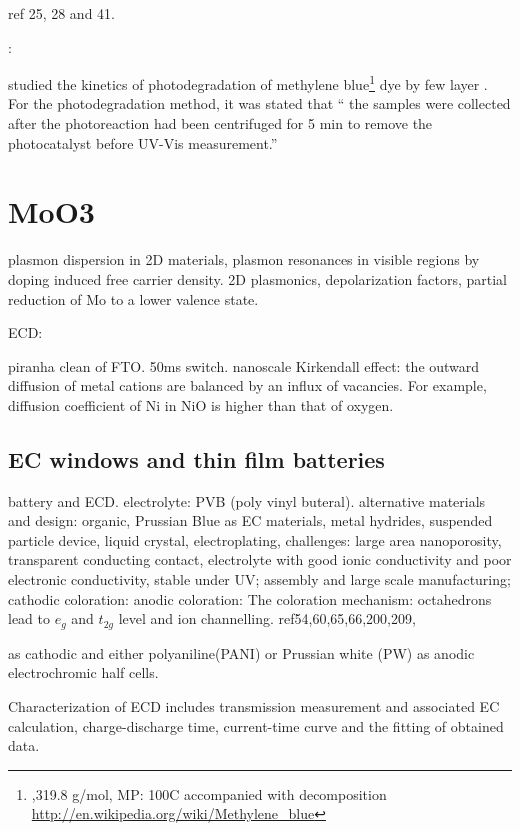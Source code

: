 ref 25, 28 and 41.

\textbf{}:

\citeauthor{Sreedhara2013} studied the kinetics of photodegradation of methylene blue\footnote{,319.8 g/mol, MP: 100C accompanied with decomposition \url{http://en.wikipedia.org/wiki/Methylene_blue}} dye by few layer .
For the photodegradation method, it was stated that `` the samples were collected after the photoreaction had been centrifuged for 5 min to remove the photocatalyst before UV-Vis measurement.''


\section{MoO3}

plasmon dispersion in 2D materials, plasmon resonances in visible regions by doping induced free carrier density. 2D plasmonics, depolarization factors, partial reduction of Mo to a lower valence state.   \cite{Alsaif2014a}



 ECD:

piranha clean of FTO. 50ms switch.\cite{Scherer2012} nanoscale Kirkendall effect: the outward diffusion of metal cations are balanced by an influx of vacancies. For example, diffusion coefficient of Ni in NiO is higher than that of oxygen.


\subsection{EC windows and thin film batteries}

battery and ECD.\cite{Granqvist2012} electrolyte: PVB (poly vinyl buteral).
alternative materials and design: organic, Prussian Blue as EC materials, metal hydrides, suspended particle device, liquid crystal, electroplating,
challenges: large area nanoporosity, transparent conducting contact, electrolyte with good ionic conductivity and poor electronic conductivity, stable under UV; assembly and large scale manufacturing;
cathodic coloration:
anodic coloration:
The coloration mechanism:  octahedrons lead to $e_g$ and $t_{2g}$ level and ion channelling.
ref54,60,65,66,200,209,


 as cathodic and either polyaniline(PANI) or Prussian white (PW) as anodic electrochromic half cells. \cite{Heckner2002}

Characterization of ECD includes transmission measurement and associated EC calculation, charge-discharge time, current-time curve and the fitting of obtained data.

